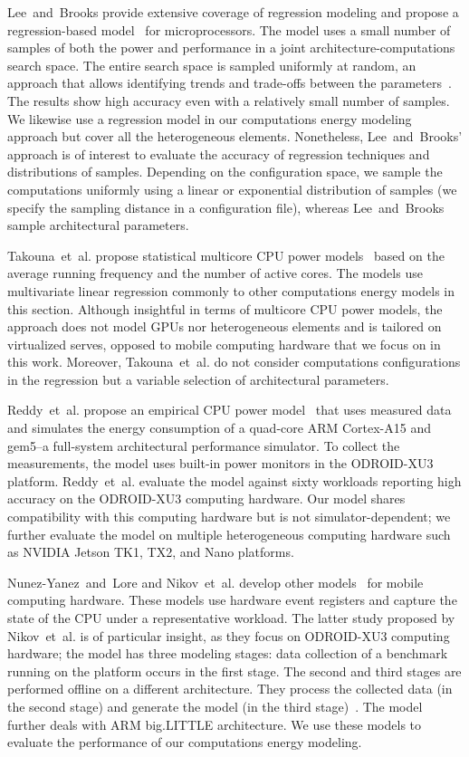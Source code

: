 Lee~and~Brooks provide extensive coverage of regression modeling and propose a regression-based model~\citep{lee2006statistically,lee2006accurate} for microprocessors. The model uses a small number of samples of both the power and performance in a joint architecture-computations search space. The entire search space is sampled uniformly at random, an approach that allows identifying trends and trade-offs between the parameters~\citep{lee2006accurate}. The results show high accuracy even with a relatively small number of samples. We likewise use a regression model in our computations energy modeling approach but cover all the heterogeneous elements. Nonetheless, Lee~and~Brooks' approach is of interest to evaluate the accuracy of regression techniques and distributions of samples. Depending on the configuration space, we sample the computations uniformly using a linear or exponential distribution of samples (we specify the sampling distance in a configuration file), whereas Lee~and~Brooks sample architectural parameters.

Takouna~et~al. propose statistical multicore CPU power models~\citep{takouna2011accurate} based on the average running frequency and the number of active cores. The models use multivariate linear regression commonly to other computations energy models in this section. Although insightful in terms of multicore CPU power models, the approach does not model GPUs nor heterogeneous elements and is tailored on virtualized serves, opposed to mobile computing hardware that we focus on in this work. Moreover, Takouna~et~al. do not consider computations configurations in the regression but a variable selection of architectural parameters.

Reddy~et~al. propose an empirical CPU power model~\citep{reddy2017empirical} that uses measured data and simulates the energy consumption of a quad-core ARM Cortex-A15 and gem5--a full-system architectural performance simulator. To collect the measurements, the model uses built-in power monitors in the ODROID-XU3 platform. Reddy~et~al. evaluate the model against sixty workloads reporting high accuracy on the ODROID-XU3 computing hardware. Our model shares compatibility with this computing hardware but is not simulator-dependent; we further evaluate the model on multiple heterogeneous computing hardware such as NVIDIA Jetson TK1, TX2, and Nano platforms.

Nunez-Yanez~and~Lore and Nikov~et~al. develop other models~\citep{nunez2013enabling,nikov2015evaluation} for mobile computing hardware. These models use hardware event registers and capture the state of the CPU under a representative workload. The latter study proposed by Nikov~et~al. is of particular insight, as they focus on ODROID-XU3 computing hardware; the model has three modeling stages: data collection of a benchmark running on the platform occurs in the first stage. The second and third stages are performed offline on a different architecture. They process the collected data (in the second stage) and generate the model (in the third stage)~\citep{seewald2019coarse}. The model further deals with ARM big.LITTLE architecture. We use these models to evaluate the performance of our computations energy modeling.

